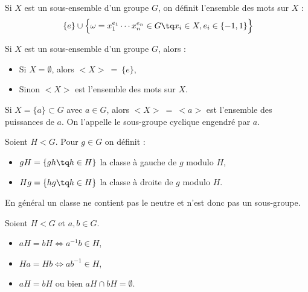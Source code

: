 \begin{defi}
 
Si $X$ est un sous-ensemble d'un groupe $G$, on définit l'ensemble des mots sur
$X$ :
\begin{displaymath} \{e\} \cup \Big\lbrace\omega = x_1^{e_1}\cdots x_n^{e_n} \in
G \tq x_i \in
X, e_i \in \lbrace-1,1\rbrace\Big\rbrace  \end{displaymath}
\end{defi}

\begin{theo}
 
Si $X$ est un sous-ensemble d'un groupe $G$, alors :
\begin{itemize}
 \item Si $X = \emptyset$, alors $<X>\ =\ \{e\}$,
 \item Sinon $<X>$ est l'ensemble des mots sur $X$.
\end{itemize}
\end{theo}

\begin{example}
 Si $X = \{a\} \subset G$ avec $a\in G$, alors $<X>\ =\ <a>$ est l'ensemble des
puissances
de $a$. On l'appelle le sous-groupe cyclique engendré par $a$.
\end{example}

\begin{defi}

 Soient $H < G$. Pour $g \in G$ on définit :
\begin{itemize}
 \item $gH = \{g h \tq h \in H\}$ la classe à gauche de $g$ modulo $H$,
 \item $Hg = \{h g \tq h \in H\}$ la classe à droite de $g$ modulo $H$.
\end{itemize}
\end{defi}

\begin{example}[Remarque]
 En général un classe ne contient pas le neutre et n'est donc pas un
sous-groupe.
\end{example}

\begin{lemm}

 Soient $H < G$ et $a,b \in G$.
\begin{itemize}
 \item $aH = bH \Leftrightarrow a^{-1}b\in H$,
 \item $Ha = Hb \Leftrightarrow ab^{-1}\in H$,
 \item $aH = bH$ ou bien $aH \cap bH = \emptyset$.
\end{itemize}
\end{lemm}

